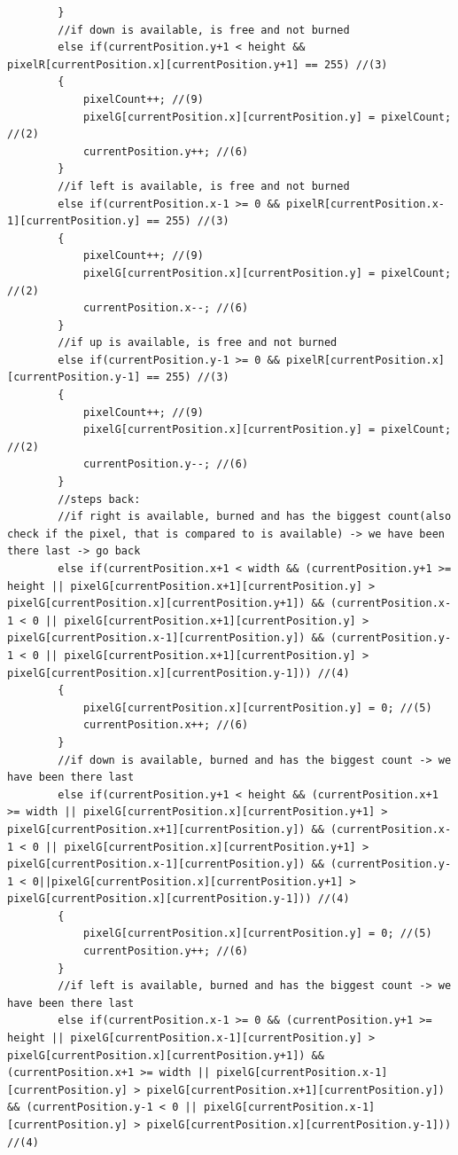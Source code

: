 \begin{lstlisting}
		}
		//if down is available, is free and not burned
		else if(currentPosition.y+1 < height && pixelR[currentPosition.x][currentPosition.y+1] == 255) //(3)
		{
			pixelCount++; //(9) 
			pixelG[currentPosition.x][currentPosition.y] = pixelCount; //(2)
			currentPosition.y++; //(6)
		}
		//if left is available, is free and not burned
		else if(currentPosition.x-1 >= 0 && pixelR[currentPosition.x-1][currentPosition.y] == 255) //(3)
		{
			pixelCount++; //(9)
			pixelG[currentPosition.x][currentPosition.y] = pixelCount; //(2)
			currentPosition.x--; //(6)
		}
		//if up is available, is free and not burned
		else if(currentPosition.y-1 >= 0 && pixelR[currentPosition.x][currentPosition.y-1] == 255) //(3)
		{
			pixelCount++; //(9)
			pixelG[currentPosition.x][currentPosition.y] = pixelCount; //(2)
			currentPosition.y--; //(6)
		}
		//steps back:
		//if right is available, burned and has the biggest count(also check if the pixel, that is compared to is available) -> we have been there last -> go back 
		else if(currentPosition.x+1 < width && (currentPosition.y+1 >= height || pixelG[currentPosition.x+1][currentPosition.y] > pixelG[currentPosition.x][currentPosition.y+1]) && (currentPosition.x-1 < 0 || pixelG[currentPosition.x+1][currentPosition.y] > pixelG[currentPosition.x-1][currentPosition.y]) && (currentPosition.y-1 < 0 || pixelG[currentPosition.x+1][currentPosition.y] > pixelG[currentPosition.x][currentPosition.y-1])) //(4)
		{
			pixelG[currentPosition.x][currentPosition.y] = 0; //(5)
			currentPosition.x++; //(6)
		}
		//if down is available, burned and has the biggest count -> we have been there last
		else if(currentPosition.y+1 < height && (currentPosition.x+1 >= width || pixelG[currentPosition.x][currentPosition.y+1] > pixelG[currentPosition.x+1][currentPosition.y]) && (currentPosition.x-1 < 0 || pixelG[currentPosition.x][currentPosition.y+1] > pixelG[currentPosition.x-1][currentPosition.y]) && (currentPosition.y-1 < 0||pixelG[currentPosition.x][currentPosition.y+1] > pixelG[currentPosition.x][currentPosition.y-1])) //(4)
		{
			pixelG[currentPosition.x][currentPosition.y] = 0; //(5)
			currentPosition.y++; //(6)
		}
		//if left is available, burned and has the biggest count -> we have been there last
		else if(currentPosition.x-1 >= 0 && (currentPosition.y+1 >= height || pixelG[currentPosition.x-1][currentPosition.y] > pixelG[currentPosition.x][currentPosition.y+1]) && (currentPosition.x+1 >= width || pixelG[currentPosition.x-1][currentPosition.y] > pixelG[currentPosition.x+1][currentPosition.y]) && (currentPosition.y-1 < 0 || pixelG[currentPosition.x-1][currentPosition.y] > pixelG[currentPosition.x][currentPosition.y-1])) //(4)

\end{lstlisting}
